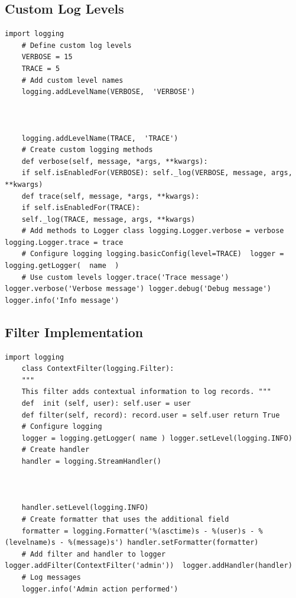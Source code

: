 \subsection{Custom Log Levels}
\begin{lstlisting}[style=pythonstyle]
	import logging
	# Define custom log levels
	VERBOSE = 15
	TRACE = 5
	# Add custom level names
	logging.addLevelName(VERBOSE,  'VERBOSE')
	
	
	
	logging.addLevelName(TRACE,  'TRACE')
	# Create custom logging methods
	def verbose(self, message, *args, **kwargs):
	if self.isEnabledFor(VERBOSE): self._log(VERBOSE, message, args, **kwargs)
	def trace(self, message, *args, **kwargs):
	if self.isEnabledFor(TRACE):
	self._log(TRACE, message, args, **kwargs)
	# Add methods to Logger class logging.Logger.verbose = verbose logging.Logger.trace = trace
	# Configure logging logging.basicConfig(level=TRACE)  logger = logging.getLogger(  name  )
	# Use custom levels logger.trace('Trace message') logger.verbose('Verbose message') logger.debug('Debug message') logger.info('Info message')
\end{lstlisting}

\subsection{Filter Implementation}
\begin{lstlisting}[style=pythonstyle]
	import logging
	class ContextFilter(logging.Filter):
	"""
	This filter adds contextual information to log records. """
	def  init (self, user): self.user = user
	def filter(self, record): record.user = self.user return True
	# Configure logging
	logger = logging.getLogger( name ) logger.setLevel(logging.INFO)
	# Create handler
	handler = logging.StreamHandler()
	
	
	
	handler.setLevel(logging.INFO)
	# Create formatter that uses the additional field
	formatter = logging.Formatter('%(asctime)s - %(user)s - %(levelname)s - %(message)s') handler.setFormatter(formatter)
	# Add filter and handler to logger logger.addFilter(ContextFilter('admin'))  logger.addHandler(handler)
	# Log messages
	logger.info('Admin action performed')
\end{lstlisting}


